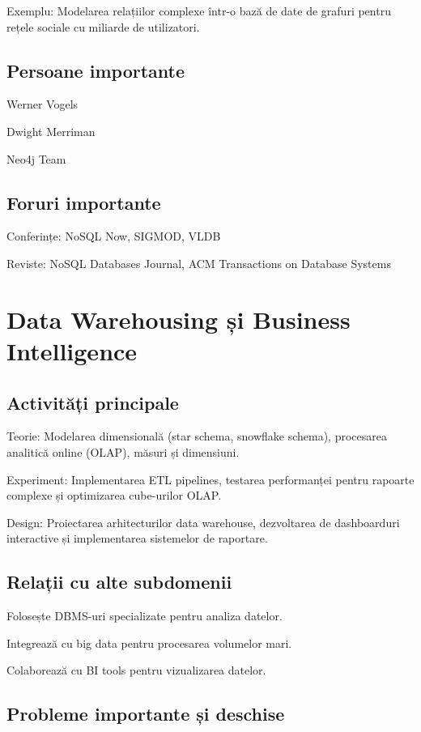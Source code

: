 \documentclass[12pt]{article}
\begin{document}
Exemplu: Modelarea relațiilor complexe într-o bază de date de grafuri pentru rețele sociale cu miliarde de utilizatori.

\subsection*{Persoane importante}

Werner Vogels

Dwight Merriman

Neo4j Team

\subsection*{Foruri importante}

Conferințe: NoSQL Now, SIGMOD, VLDB

Reviste: NoSQL Databases Journal, ACM Transactions on Database Systems

\section{Data Warehousing și Business Intelligence}

\subsection*{Activități principale}

Teorie: Modelarea dimensională (star schema, snowflake schema), procesarea analitică online (OLAP), măsuri și dimensiuni.

Experiment: Implementarea ETL pipelines, testarea performanței pentru rapoarte complexe și optimizarea cube-urilor OLAP.

Design: Proiectarea arhitecturilor data warehouse, dezvoltarea de dashboarduri interactive și implementarea sistemelor de raportare.

\subsection*{Relații cu alte subdomenii}

Folosește DBMS-uri specializate pentru analiza datelor.

Integrează cu big data pentru procesarea volumelor mari.

Colaborează cu BI tools pentru vizualizarea datelor.

\subsection*{Probleme importante și deschise}
\end{document}
